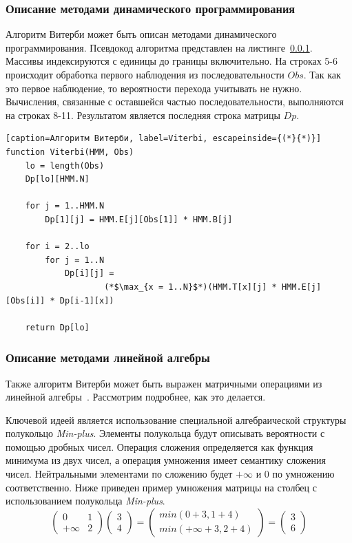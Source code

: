 \subsubsection{Описание методами динамического программирования}
\label{lab:dyn_Viterbi}
Алгоритм Витерби может быть описан методами динамического программирования.
Псевдокод алгоритма представлен на листинге~\ref{lab:dyn_Viterbi}.
Массивы индексируются с единицы до границы включительно.
На строках 5-6 происходит обработка первого наблюдения из последовательности $Obs$.
Так как это первое наблюдение, то вероятности перехода учитывать не нужно.
Вычисления, связанные с оставшейся частью последовательности, выполняются на строках 8-11.
Результатом является последняя строка матрицы $Dp$.
\begin{lstlisting}[caption=Алгоритм Витерби, label=Viterbi, escapeinside={(*}{*)}]
function Viterbi(HMM, Obs)
	lo = length(Obs)
	Dp[lo][HMM.N]

	for j = 1..HMM.N
		Dp[1][j] = HMM.E[j][Obs[1]] * HMM.B[j]
	
	for i = 2..lo
		for j = 1..N
			Dp[i][j] = 
					(*$\max_{x = 1..N}$*)(HMM.T[x][j] * HMM.E[j][Obs[i]] * Dp[i-1][x])

	return Dp[lo]
\end{lstlisting}


\subsubsection{Описание методами линейной алгебры}
\label{lab:LA_Viterbi}
Также алгоритм Витерби может быть выражен матричными 
операциями из линейной алгебры~\cite{LA_Viterbi}.
Рассмотрим подробнее, как это делается.

Ключевой идеей является использование специальной 
алгебраической структуры полукольцо \emph{Min-plus}.
Элементы полукольца будут описывать вероятности с
помощью дробных чисел.
Операция сложения определяется как функция
минимума из двух чисел, а операция умножения имеет семантику
сложения чисел.
Нейтральными элементами по сложению будет $+\infty$ 
и 0 по умножению соответственно.
Ниже приведен пример умножения матрицы на столбец 
с использованием полукольца \emph{Min-plus}.
\[
  \begin{pmatrix}
    0 & 1 \\
    +\infty & 2
  \end{pmatrix}
  \begin{pmatrix}
    3 \\
    4
  \end{pmatrix}
  =
  \begin{pmatrix}
    min(0 + 3, 1 + 4) \\
    min(+\infty + 3, 2 + 4)
  \end{pmatrix}
  =
  \begin{pmatrix}
    3 \\
    6
  \end{pmatrix}
\]

